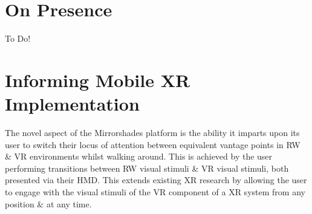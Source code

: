
\section{On Presence}

To Do!



\section{Informing Mobile XR Implementation}

\newcommand{\breakinpresencefootnote}{\footnote{The definition of \textbf{break in presence} adopted herein is the second from Waterworth \& Waterworth~\cite{Waterworth2001} (p205): a movement along the focus axis away from presence in the real or a virtual environment \& toward absence. This differs to Slater \& Steed's original definition in~\cite{Slater2000} as they considered presence only in terms of attending to stimuli from a virtual environment, with a break in presence as a Gestalt switch to instead attending to stimuli from the real environment. Waterworth \& Waterworth's model considers presence in terms of attending to stimuli from either the real \textit{or a virtual} environment, with a break in presence representing absence in the sense of heightened conceptual load \& the resultant reduced perceptual processing of environmental stimuli originating from \textit{either} the real or a virtual environment. This definition better fits the situation invoked by the Mirrorshades platform, which is concerned with intentionally \& willingly switching engagement between stimuli from both real \& virtual environments, rather than engaging with stimuli from only a virtual environment in a scenario where stimuli from the real environment are considered a `distraction'.}}

The novel aspect of the Mirrorshades platform is the ability it imparts upon its user to switch their locus of attention between equivalent vantage points in RW \& VR environments whilst walking around. This is achieved by the user performing transitions between RW visual stimuli \& VR visual stimuli, both presented via their HMD. This extends existing XR research by allowing the user to engage with the visual stimuli of the VR component of a XR system from any position \& at any time.

